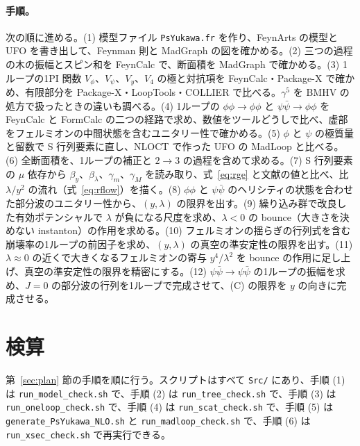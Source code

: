 \documentclass[a4paper,10pt]{ltjsarticle}
\begin{document}
\paragraph{手順。}次の順に進める。(1) 模型ファイル \texttt{PsYukawa.fr} を作り、FeynArts の模型と UFO を書き出して、Feynman 則と MadGraph の図を確かめる。(2) 三つの過程の木の振幅とスピン和を FeynCalc で、断面積を MadGraph で確かめる。(3) 1ループの1PI 関数 $V_\phi$、$V_\psi$、$V_y$、$V_4$ の極と対抗項を FeynCalc・Package-X で確かめ、有限部分を Package-X・LoopTools・COLLIER で比べる。$\gamma^5$ を BMHV の処方で扱ったときの違いも調べる。(4) 1ループの $\phi\phi\to\phi\phi$ と $\psi\bar\psi\to\phi\phi$ を FeynCalc と FormCalc の二つの経路で求め、数値をツールどうしで比べ、虚部をフェルミオンの中間状態を含むユニタリー性で確かめる。(5) $\phi$ と $\psi$ の極質量と留数で S 行列要素に直し、NLOCT で作った UFO の MadLoop と比べる。(6) 全断面積を、1ループの補正と $2\to3$ の過程を含めて求める。(7) S 行列要素の $\mu$ 依存から $\beta_y$、$\beta_\lambda$、$\gamma_m$、$\gamma_M$ を読み取り、式~\eqref{eq:rge} と文献の値と比べ、比 $\lambda/y^2$ の流れ（式~\eqref{eq:rflow}）を描く。(8) $\phi\phi$ と $\psi\bar\psi$ のヘリシティの状態を合わせた部分波のユニタリー性から、$(y,\lambda)$ の限界を出す。(9) 繰り込み群で改良した有効ポテンシャルで $\lambda$ が負になる尺度を求め、$\lambda<0$ の bounce（大きさを決めない instanton）の作用を求める。(10) フェルミオンの揺らぎの行列式を含む崩壊率の1ループの前因子を求め、$(y,\lambda)$ の真空の準安定性の限界を出す。(11) $\lambda\approx0$ の近くで大きくなるフェルミオンの寄与 $y^4/\lambda^2$ を bounce の作用に足し上げ、真空の準安定性の限界を精密にする。(12) $\psi\bar\psi\to\psi\bar\psi$ の1ループの振幅を求め、$J=0$ の部分波の行列を1ループで完成させて、(C) の限界を $y$ の向きに完成させる。

\section{検算}\label{sec:checks}

第~\ref{sec:plan} 節の手順を順に行う。スクリプトはすべて \texttt{Src/} にあり、手順 (1) は \texttt{run\_model\_check.sh} で、手順 (2) は \texttt{run\_tree\_check.sh} で、手順 (3) は \texttt{run\_oneloop\_check.sh} で、手順 (4) は \texttt{run\_scat\_check.sh} で、手順 (5) は \texttt{generate\_PsYukawa\_NLO.sh} と \texttt{run\_madloop\_check.sh} で、手順 (6) は \texttt{run\_xsec\_check.sh} で再実行できる。
\end{document}
